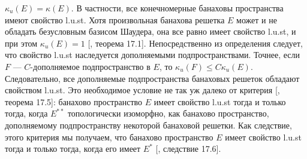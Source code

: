 $\kappa_u(E)=\kappa(E)$. В частности, все конечномерные банаховы пространства
имеют свойство l.u.st. Хотя произвольная банахова решетка $E$ может и не
обладать безусловным базисом Шаудера, она все равно имеет свойство l.u.st, и при
этом $\kappa_u(E)=1$  [\cite{DiestAbsSumOps}, теорема 17.1]. Непосредственно из
определения следует, что свойство l.u.st наследуется дополняемыми
подпространствами. Точнее, если $F$ --- $C$-дополняемое подпространство в $E$,
то $\kappa_u(F)\leq C\kappa_u(E)$. Следовательно, все дополняемые
подпространства банаховых решеток обладают свойством l.u.st. Это необходимое
условие не так уж далеко от критерия [\cite{DiestAbsSumOps}, теорема 17.5]:
банахово пространство $E$ имеет свойство l.u.st тогда и только тогда, когда
$E^{**}$ топологически изоморфно, как банахово пространство, дополняемому
подпространству некоторой банаховой решетки. Как следствие, этого критерия мы
получаем, что банахово пространство $E$ имеет свойство l.u.st тогда и только
тогда, когда его имеет $E^*$ [\cite{DiestAbsSumOps}, следствие 17.6].


